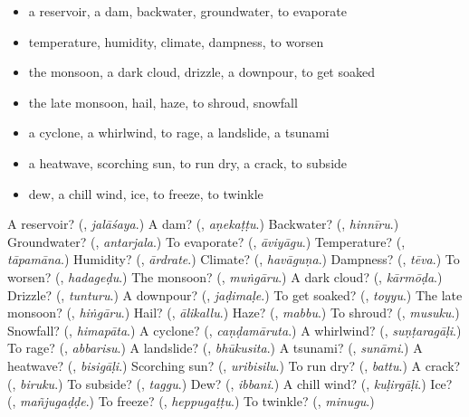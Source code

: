 \begin{itemize}
\raggedright
  \item a reservoir, a dam, backwater, groundwater, to evaporate
  \item temperature, humidity, climate, dampness, to worsen
  \item the monsoon, a dark cloud, drizzle, a downpour, to get soaked
  \item the late monsoon, hail, haze, to shroud, snowfall
  \item a cyclone, a whirlwind, to rage, a landslide, a tsunami
  \item a heatwave, scorching sun, to run dry, a crack, to subside
  \item dew, a chill wind, ice, to freeze, to twinkle
\end{itemize}

\begin{tcolorbox}[breakable,colback=teal!4,colframe=teal!35!black,title={Before you move on}]
A reservoir? (\textbf{}, \emph{jalāśaya}.) A dam? (\textbf{}, \emph{aṇekaṭṭu}.) Backwater? (\textbf{}, \emph{hinnīru}.) Groundwater? (\textbf{}, \emph{antarjala}.) To evaporate? (\textbf{}, \emph{āviyāgu}.) Temperature? (\textbf{}, \emph{tāpamāna}.) Humidity? (\textbf{}, \emph{ārdrate}.) Climate? (\textbf{}, \emph{havāguṇa}.) Dampness? (\textbf{}, \emph{tēva}.) To worsen? (\textbf{}, \emph{hadageḍu}.) The monsoon? (\textbf{}, \emph{muṅgāru}.) A dark cloud? (\textbf{}, \emph{kārmōḍa}.) Drizzle? (\textbf{}, \emph{tunturu}.) A downpour? (\textbf{}, \emph{jaḍimaḷe}.) To get soaked? (\textbf{}, \emph{toyyu}.) The late monsoon? (\textbf{}, \emph{hiṅgāru}.) Hail? (\textbf{}, \emph{ālikallu}.) Haze? (\textbf{}, \emph{mabbu}.) To shroud? (\textbf{}, \emph{musuku}.) Snowfall? (\textbf{}, \emph{himapāta}.) A cyclone? (\textbf{}, \emph{caṇḍamāruta}.) A whirlwind? (\textbf{}, \emph{suṇṭaragāḷi}.) To rage? (\textbf{}, \emph{abbarisu}.) A landslide? (\textbf{}, \emph{bhūkusita}.) A tsunami? (\textbf{}, \emph{sunāmi}.) A heatwave? (\textbf{}, \emph{bisigāḷi}.) Scorching sun? (\textbf{}, \emph{uribisilu}.) To run dry? (\textbf{}, \emph{battu}.) A crack? (\textbf{}, \emph{biruku}.) To subside? (\textbf{}, \emph{taggu}.) Dew? (\textbf{}, \emph{ibbani}.) A chill wind? (\textbf{}, \emph{kuḷirgāḷi}.) Ice? (\textbf{}, \emph{mañjugaḍḍe}.) To freeze? (\textbf{}, \emph{heppugaṭṭu}.) To twinkle? (\textbf{}, \emph{minugu}.)
\end{tcolorbox}
